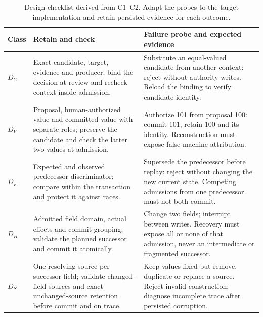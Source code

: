 \begin{table}[p]
\centering
\caption{Design checklist derived from C1--C2. Adapt the probes to the target implementation and retain persisted evidence for each outcome.}
\label{tab:design-checklist}
\begin{tabularx}{\textwidth}{@{}l>{\raggedright\arraybackslash}p{}>{\raggedright\arraybackslash}X@{}}
\toprule
Class & Retain and check & Failure probe and expected evidence \\
\midrule
$D_C$ & Exact candidate, target, evidence and producer; bind the decision at review and recheck context inside admission. & Substitute an equal-valued candidate from another context: reject without authority writes. Reload the binding to verify candidate identity. \\
\addlinespace
$D_V$ & Proposal, human-authorized value and committed value with separate roles; preserve the candidate and check the latter two values at admission. & Authorize 101 from proposal 100: commit 101, retain 100 and its identity. Reconstruction must expose false machine attribution. \\
\addlinespace
$D_F$ & Expected and observed predecessor discriminator; compare within the transaction and protect it against races. & Supersede the predecessor before replay: reject without changing the new current state. Competing admissions from one predecessor must not both commit. \\
\addlinespace
$D_B$ & Admitted field domain, actual effects and commit grouping; validate the planned successor and commit it atomically. & Change two fields; interrupt between writes. Recovery must expose all or none of that admission, never an intermediate or fragmented successor. \\
\addlinespace
$D_S$ & One resolving source per successor field; validate changed-field sources and exact unchanged-source retention before commit and on trace. & Keep values fixed but remove, duplicate or replace a source. Reject invalid construction; diagnose incomplete trace after persisted corruption. \\
\bottomrule
\end{tabularx}
\end{table}
